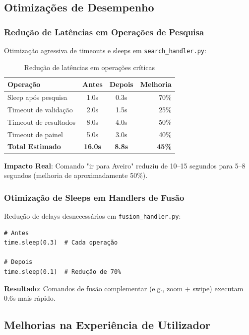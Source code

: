 \documentclass{report}
\begin{document}
\subsection{Otimizações de Desempenho}

\subsubsection{Redução de Latências em Operações de Pesquisa}

Otimização agressiva de timeouts e sleeps em \texttt{search\_handler.py}:

\begin{table}[h]
\centering
\caption{Redução de latências em operações críticas}
\label{tab:performance-improvements}
\begin{tabular}{lccr}
\toprule
\textbf{Operação} & \textbf{Antes} & \textbf{Depois} & \textbf{Melhoria} \\
\midrule
Sleep após pesquisa & 1.0s & 0.3s & 70\% \\
Timeout de validação & 2.0s & 1.5s & 25\% \\
Timeout de resultados & 8.0s & 4.0s & 50\% \\
Timeout de painel & 5.0s & 3.0s & 40\% \\
\midrule
\textbf{Total Estimado} & \textbf{16.0s} & \textbf{8.8s} & \textbf{45\%} \\
\bottomrule
\end{tabular}
\end{table}

\textbf{Impacto Real}: Comando "ir para Aveiro" reduziu de 10--15 segundos para 5--8 segundos (melhoria de aproximadamente 50\%).

\subsubsection{Otimização de Sleeps em Handlers de Fusão}

Redução de delays desnecessários em \texttt{fusion\_handler.py}:

\begin{verbatim}
# Antes
time.sleep(0.3)  # Cada operação

# Depois  
time.sleep(0.1)  # Redução de 70%
\end{verbatim}

\textbf{Resultado}: Comandos de fusão complementar (e.g., zoom + swipe) executam 0.6s mais rápido.


\subsection{Melhorias na Experiência de Utilizador}
\end{document}
